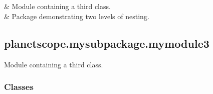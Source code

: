 \documentclass[letterpaper,10pt,english]{sphinxmanual}
\begin{document}
\begin{savenotes}\sphinxatlongtablestart\begin{longtable}[c]{}
\hline

\endfirsthead

%
{}\\
\hline

\endhead

\hline
{}\\
\endfoot

\endlastfoot

\sphinxAtStartPar
{\hyperref[\detokenize{_autosummary/planetscope.mysubpackage.mymodule3:module-planetscope.mysubpackage.mymodule3}]{}}
&
\sphinxAtStartPar
Module containing a third class.
\\
\hline
\sphinxAtStartPar
{\hyperref[\detokenize{_autosummary/planetscope.mysubpackage.mysubsubpackage:module-planetscope.mysubpackage.mysubsubpackage}]{}}
&
\sphinxAtStartPar
Package demonstrating two levels of nesting.
\\
\hline
\end{longtable}\sphinxatlongtableend\end{savenotes}


\subsection{planetscope.mysubpackage.mymodule3}
\label{\detokenize{_autosummary/planetscope.mysubpackage.mymodule3:module-planetscope.mysubpackage.mymodule3}}\label{\detokenize{_autosummary/planetscope.mysubpackage.mymodule3:planetscope-mysubpackage-mymodule3}}\label{\detokenize{_autosummary/planetscope.mysubpackage.mymodule3::doc}}
\sphinxAtStartPar
Module containing a third class.
\subsubsection*{Classes}
\end{document}
